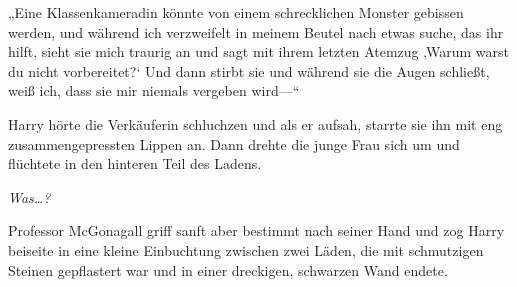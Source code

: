 „Eine Klassenkameradin könnte von einem schrecklichen Monster gebissen werden, und während ich verzweifelt in meinem Beutel nach etwas suche, das ihr hilft, sieht sie mich traurig an und sagt mit ihrem letzten Atemzug ‚Warum warst du nicht vorbereitet?‘ Und dann stirbt sie und während sie die Augen schließt, weiß ich, dass sie mir niemals vergeben wird—“

Harry hörte die Verkäuferin schluchzen und als er aufsah, starrte sie ihn mit eng zusammengepressten Lippen an. Dann drehte die junge Frau sich um und flüchtete in den hinteren Teil des Ladens.

\emph{Was…? }

Professor McGonagall griff sanft aber bestimmt nach seiner Hand und zog Harry beiseite in eine kleine Einbuchtung zwischen zwei Läden, die mit schmutzigen Steinen gepflastert war und in einer dreckigen, schwarzen Wand endete.

